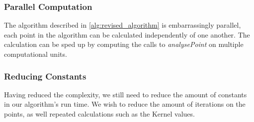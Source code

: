\subsubsection{Parallel Computation}
The algorithm described in \cref{alg:revised_algorithm} is embarrassingly parallel, each point in the algorithm can be calculated independently of one another. The calculation can be sped up by computing the calls to \emph{analysePoint} on multiple computational units.

\subsubsection{Reducing Constants}

Having reduced the complexity, we still need to reduce the amount of constants in our algorithm's run time. We wish to reduce the amount of iterations on the points, as well repeated calculations such as the Kernel values.




